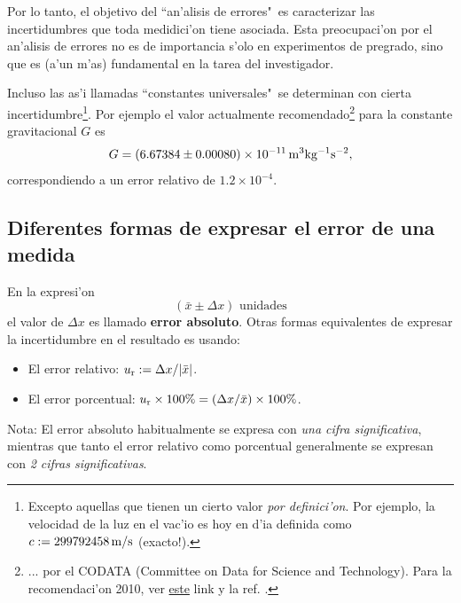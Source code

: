 Por lo tanto, el objetivo del ``an'alisis de errores"\, es caracterizar las incertidumbres que toda medidici'on tiene asociada. Esta preocupaci'on por el an'alisis de errores no es de importancia s'olo en experimentos de pregrado, sino que es (a'un m'as) fundamental en la tarea del investigador.

Incluso las as'i llamadas ``constantes universales"\ se determinan con cierta incertidumbre\footnote{Excepto aquellas que tienen un cierto valor \textit{por definici'on}. Por ejemplo, la velocidad de la luz en el vac'io es hoy en d'ia definida como $c:=299792458\,{\rm m/s}$ (exacto!).}. Por ejemplo el valor actualmente recomendado\footnote{... por el CODATA (Committee on Data for Science and Technology). Para la recomendaci'on 2010, ver \href{http://www.codata.org/committees-and-groups/fundamental-physical-constants/tgfc-previous-values-and-publications}{este} link y la ref. \cite{CODATA2010}.} para la constante gravitacional $G$ es 
\begin{equation}\label{G}
G=(6.67384\pm 0.00080)\times 10^{-11}\,{\rm m^3kg^{-1}s^{-2}} ,
\end{equation}
correspondiendo a un error relativo de $1.2\times 10^{-4}$.

\subsection{Diferentes formas de expresar el error de una medida}

En la expresi'on
\begin{equation}
(\bar{x}\pm\Delta x) \text{ unidades}
\end{equation}
el valor de $\Delta x$ es llamado \textbf{error absoluto}. Otras formas equivalentes de expresar la incertidumbre en el resultado es usando:
\begin{itemize}
\item El error relativo:  $u_{\rm r}:=\Delta x/|\bar{x}|$.
\item El error porcentual:  $u_{\rm r}\times 100\% = (\Delta x/\bar{x})\times 100\%$.
\end{itemize}

Nota: El error absoluto habitualmente se expresa con \textit{una cifra significativa}, mientras que tanto el error relativo como porcentual generalmente se expresan con \textit{2 cifras significativas}.

